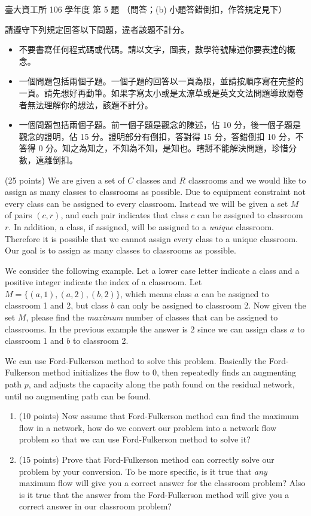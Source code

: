 \begin{pastexam}[label={px:ntu-106-dsa-05}]{臺大資工所 106 學年度 第 5 題}
（問答；(b) 小題答錯倒扣，作答規定見下）

請遵守下列規定回答以下問題，違者該題不計分。
\begin{itemize}
\item 不要書寫任何程式碼或代碼。請以文字，圖表，數學符號陳述你要表達的概念。
\item 一個問題包括兩個子題。一個子題的回答以一頁為限，並請按順序寫在完整的一頁。請先想好再動筆。如果字寫太小或是太潦草或是英文文法問題導致閱卷者無法理解你的想法，該題不計分。
\item 一個問題包括兩個子題。前一個子題是觀念的陳述，佔 10 分，後一個子題是觀念的證明，佔 15 分。證明部分有倒扣，答對得 15 分，答錯倒扣 10 分，不答得 0 分。知之為知之，不知為不知，是知也。瞎掰不能解決問題，珍惜分數，遠離倒扣。
\end{itemize}

(25 points) We are given a set of $C$ classes and $R$ classrooms and we would like to assign as
many classes to classrooms as possible. Due to equipment constraint not every class can be
assigned to every classroom. Instead we will be given a set $M$ of pairs $(c,r)$, and each pair
indicates that class $c$ can be assigned to classroom $r$. In addition, a class, if assigned,
will be assigned to a \textit{unique} classroom. Therefore it is possible that we cannot assign
every class to a unique classroom. Our goal is to assign as many classes to classrooms as
possible.

We consider the following example. Let a lower case letter indicate a class and a positive
integer indicate the index of a classroom. Let $M=\{(a,1),(a,2),(b,2)\}$, which means class $a$
can be assigned to classroom 1 and 2, but class $b$ can only be assigned to classroom 2. Now
given the set $M$, please find the \textit{maximum} number of classes that can be assigned to
classrooms. In the previous example the answer is 2 since we can assign class $a$ to classroom
1 and $b$ to classroom 2.

We can use Ford-Fulkerson method to solve this problem. Basically the Ford-Fulkerson method
initializes the flow to 0, then repeatedly finds an augmenting path $p$, and adjusts the
capacity along the path found on the residual network, until no augmenting path can be found.
\begin{enumerate}[label=(\alph*)]
\item (10 points) Now assume that Ford-Fulkerson method can find the maximum flow in a network,
how do we convert our problem into a network flow problem so that we can use Ford-Fulkerson
method to solve it?
\item (15 points) Prove that Ford-Fulkerson method can correctly solve our problem by your
conversion. To be more specific, is it true that \textit{any} maximum flow will give you a
correct answer for the classroom problem? Also is it true that the answer from the
Ford-Fulkerson method will give you a correct answer in our classroom problem?
\end{enumerate}
\end{pastexam}

